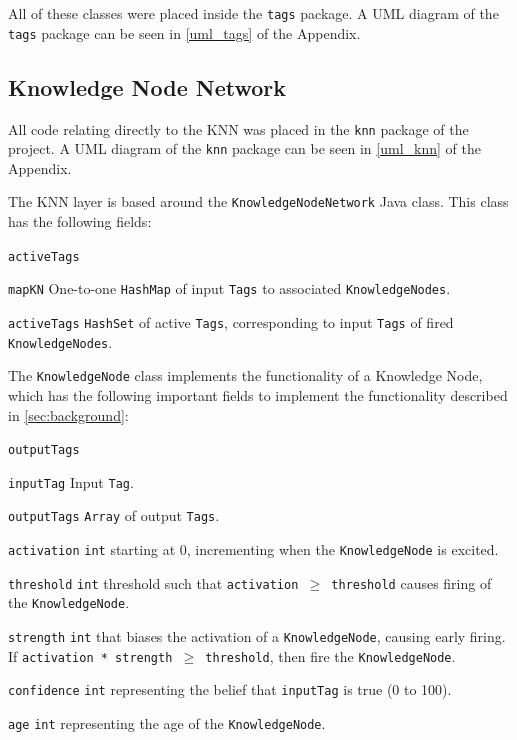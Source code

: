 \documentclass[titlepage,11pt]{article}
\newcommand{\code}[1]{\texttt{#1}}
\begin{document}
All of these classes were placed inside the \code{tags} package. A UML diagram of the \code{tags} package can be seen in \autoref{uml_tags} of the Appendix.

\subsection{Knowledge Node Network}

All code relating directly to the KNN was placed in the \code{knn} package of the project. A UML diagram of the \code{knn} package can be seen in \autoref{uml_knn} of the Appendix.

The KNN layer is based around the \code{KnowledgeNodeNetwork} Java class. This class has the following fields:

\begin{labeling}{\code{activeTags}}
	\item[\code{mapKN}] One-to-one \code{HashMap} of input \code{Tags} to associated \code{KnowledgeNodes}.
	\item[\code{activeTags}] \code{HashSet} of active \code{Tags}, corresponding to input \code{Tags} of fired \code{KnowledgeNodes}.
\end{labeling}

The \code{KnowledgeNode} class implements the functionality of a Knowledge Node, which has the following important fields to implement the functionality described in \autoref{sec:background}:

\begin{labeling}{\code{outputTags}}
	\item[\code{inputTag}] Input \code{Tag}.
	\item[\code{outputTags}] \code{Array} of output \code{Tags}.
	\item[\code{activation}] \code{int} starting at 0, incrementing when the \code{KnowledgeNode} is excited.
	\item[\code{threshold}] \code{int} threshold such that \code{activation $\geq$ threshold} causes firing of the \code{KnowledgeNode}.
	\item[\code{strength}] \code{int} that biases the activation of a \code{KnowledgeNode}, causing early firing. If \code{activation * strength $\geq$ threshold}, then fire the \code{KnowledgeNode}.
	\item[\code{confidence}] \code{int} representing the belief that \code{inputTag} is true (0 to 100).
	\item[\code{age}] \code{int} representing the age of the \code{KnowledgeNode}.
\end{labeling}
\end{document}
